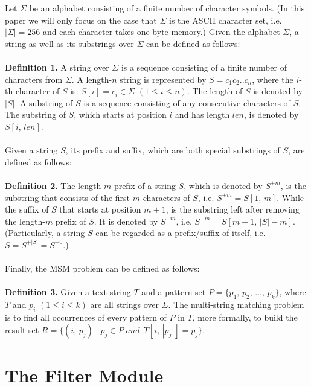\documentclass{article}
\begin{document}
Let $\Sigma$ be an \textsf{alphabet} consisting of a finite number of
character symbols. (In this paper we will only focus on the case that
$\Sigma$ is the ASCII character set, i.e. $|\Sigma| = 256$ and each
character takes one byte memory.) Given the alphabet $\Sigma$, a
\textsf{string} as well as its \textsf{substrings} over
$\Sigma$ can be defined as follows:\\
\\
\textbf{Definition 1.} A \textsf{string} over $\Sigma$ is a sequence
consisting of a finite number of characters from $\Sigma$. A
length-$n$ string is represented by $S = c_1c_2..c_n$, where the
$i$-th character of $S$ is: $S[i] = c_i \in \Sigma$
$(1 \leq i \leq n)$. The length of $S$ is denoted by $|S|$. A
\textsf{substring} of $S$ is a sequence consisting of any consecutive
characters of $S$. The substring of $S$, which starts at
position $i$ and has length $len$, is denoted by $S[i,\,len]$.\\
\\
Given a string $S$, its \textsf{prefix} and \textsf{suffix},
which are both special substrings of $S$, are defined as follows:\\
\\
\textbf{Definition 2.} The length-$m$ \textsf{prefix} of a string $S$,
which is denoted by $S^{+m}$, is the substring that consists of the
first $m$ characters of $S$, i.e. $S^{+m}=S[1,\,m]$.  While the
\textsf{suffix} of $S$ that starts at position $m+1$, is the substring
left after removing the length-$m$ prefix of $S$. It is denoted by
$S^{-m}$, i.e. $S^{-m} = S[m+1,\,|S|-m]$. (Particularly, a string $S$
can be regarded as a prefix/suffix of itself, i.e. $S=S^{+|S|}=S^{-0}$.)\\
\\
Finally, the MSM problem can be defined as follows: \\
\\
\textbf{Definition 3.} Given a text string $T$ and a pattern set
$P=\{p_1,\,p_2,\,\dots,\,p_k\}$, where $T$ and $p_i$
$(1 \leq i \leq k)$ are all strings over $\Sigma$. The multi-string
matching problem is to find all occurrences of every pattern of $P$ in
$T$, more formally, to build the result set
$R = \{(i,\, p_j)\;|\; p_j \in P\; and\,\; T[i,\,|p_j|]=p_j\}$.


\section{The Filter Module}
\label{sec:filter}
\end{document}
